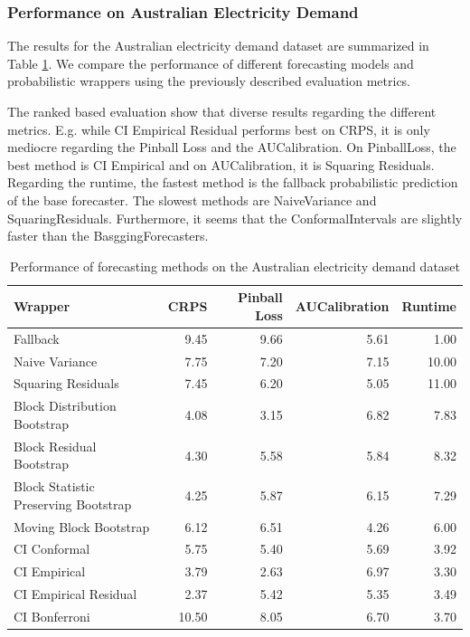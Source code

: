 \subsubsection{Performance on Australian Electricity Demand}
The results for the Australian electricity demand dataset are summarized in Table \ref{table:aus_elec_results}. We compare the performance of different forecasting models and probabilistic wrappers using the previously described evaluation metrics. 

The ranked based evaluation show that diverse results regarding the different metrics. E.g. while CI Empirical Residual performs best on CRPS, it is only mediocre regarding the Pinball Loss and the AUCalibration. On PinballLoss, the best method is CI Empirical and on AUCalibration, it is Squaring Residuals. Regarding the runtime, the fastest method is the fallback probabilistic prediction of the base forecaster. The slowest methods are NaiveVariance and SquaringResiduals. Furthermore, it seems that the ConformalIntervals are slightly faster than the BasggingForecasters.

\begin{table}[h]
    \centering
    \caption{Performance of forecasting methods on the Australian electricity demand dataset}
    \label{table:aus_elec_results}
\begin{tabular}{lrrrr}
\toprule
Wrapper & CRPS & Pinball Loss & AUCalibration & Runtime \\
\midrule
Fallback & 9.45 & 9.66 & 5.61 & 1.00 \\
Naive Variance & 7.75 & 7.20 & 7.15 & 10.00 \\
Squaring Residuals & 7.45 & 6.20 & 5.05 & 11.00 \\
Block Distribution Bootstrap & 4.08 & 3.15 & 6.82 & 7.83 \\
Block Residual Bootstrap & 4.30 & 5.58 & 5.84 & 8.32 \\
Block Statistic Preserving Bootstrap & 4.25 & 5.87 & 6.15 & 7.29 \\
Moving Block Bootstrap & 6.12 & 6.51 & 4.26 & 6.00 \\
CI Conformal & 5.75 & 5.40 & 5.69 & 3.92 \\
CI Empirical & 3.79 & 2.63 & 6.97 & 3.30 \\
CI Empirical Residual & 2.37 & 5.42 & 5.35 & 3.49 \\
CI Bonferroni  & 10.50 & 8.05 & 6.70 & 3.70 \\
\bottomrule
\end{tabular}

\end{table}

